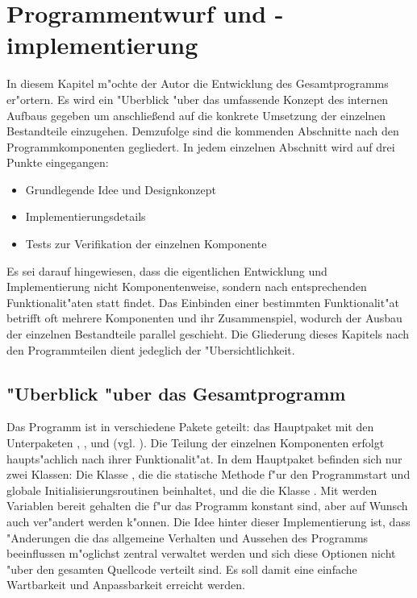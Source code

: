 \chapter{Programmentwurf und -implementierung}
\label{chap:entwurf}

In diesem Kapitel m"ochte der Autor die Entwicklung des Gesamtprogramms er"ortern.
Es wird ein "Uberblick "uber das umfassende Konzept des internen Aufbaus gegeben um anschlie\ss end auf die konkrete Umsetzung der einzelnen Bestandteile einzugehen.
Demzufolge sind die kommenden Abschnitte nach den Programmkomponenten gegliedert.
In jedem einzelnen Abschnitt wird auf drei Punkte eingegangen:
\begin{itemize}
	\item Grundlegende Idee und Designkonzept
	\item Implementierungsdetails
	\item Tests zur Verifikation der einzelnen Komponente
\end{itemize}
Es sei darauf hingewiesen, dass die eigentlichen Entwicklung und Implementierung nicht Komponentenweise, sondern nach entsprechenden Funktionalit"aten statt findet.
Das Einbinden einer bestimmten Funktionalit"at betrifft oft mehrere Komponenten und ihr Zusammenspiel, wodurch der Ausbau der einzelnen Bestandteile parallel geschieht.
Die Gliederung dieses Kapitels nach den Programmteilen dient jedeglich der "Ubersichtlichkeit.

\section{"Uberblick "uber das Gesamtprogramm}

Das Programm ist in verschiedene Pakete geteilt: das Hauptpaket  mit den Unterpaketen , ,  und  (vgl. ).
Die Teilung der einzelnen Komponenten erfolgt haupts"achlich nach ihrer Funktionalit"at.
In dem Hauptpaket  befinden sich nur zwei Klassen:
Die Klasse , die die statische Methode f"ur den Programmstart und globale Initialisierungsroutinen beinhaltet, und die die Klasse .
Mit  werden Variablen bereit gehalten die f"ur das Programm konstant sind, aber auf Wunsch auch ver"andert werden k"onnen.
Die Idee hinter dieser Implementierung ist, dass "Anderungen die das allgemeine Verhalten und Aussehen des Programms beeinflussen m"oglichst zentral verwaltet werden und sich diese Optionen nicht "uber den gesamten Quellcode verteilt sind.
Es soll damit eine einfache Wartbarkeit und Anpassbarkeit erreicht werden.

